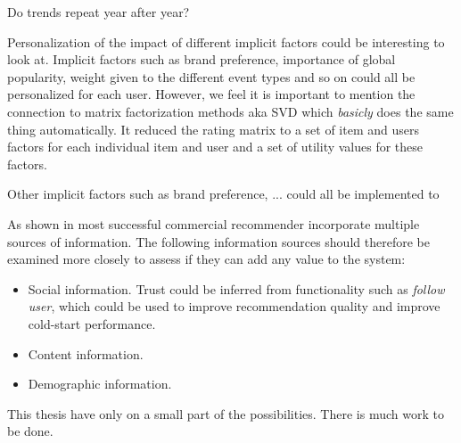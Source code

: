 Do trends repeat year after year?

Personalization of the impact of different implicit factors could be interesting to look at.
Implicit factors such as brand preference, importance of global popularity, weight given
to the different event types and so on could all be personalized for each user.
However, we feel it is important to mention the connection to matrix factorization methods
aka SVD which \emph{basicly} does the same thing automatically. It reduced the rating matrix
to a set of item and users factors for each individual item and user and a set of utility values
for these factors.


Other implicit factors such as brand preference, ... could all be implemented to



As shown in \cite{FranceTelecom} most successful commercial recommender incorporate multiple
sources of information. The following information sources should therefore be examined more
closely to assess if they can add any value to the system:

\begin{itemize}
\item Social information. Trust could be inferred from functionality such as \emph{follow user}, which
	  could be used to improve recommendation quality and improve cold-start performance.
\item Content information.
\item Demographic information.
\end{itemize}




This thesis have only on a small part of the possibilities. There is much work to be done. %

